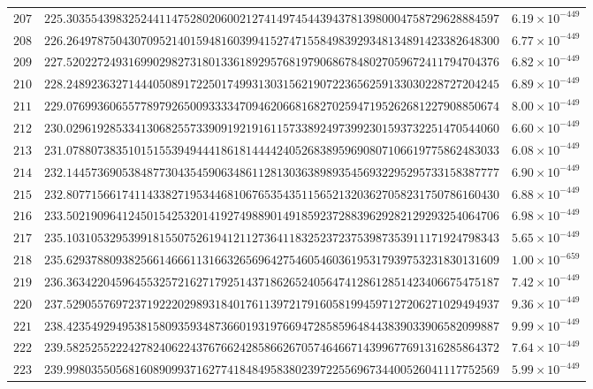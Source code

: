 \documentclass[12pt,reqno]{amsart}
\theoremstyle{remark}
\begin{document}
\begin{longtable}{clc}
$207$ & $225.3035543983252441147528020600212741497454439437813980004758729628884597$ & $6.19\times 10^{-449}$ \\
$208$ & $226.2649787504307095214015948160399415274715584983929348134891423382648300$ & $6.77\times 10^{-449}$ \\
$209$ & $227.5202272493169902982731801336189295768197906867848027059672411794704376$ & $6.82\times 10^{-449}$ \\
$210$ & $228.2489236327144405089172250174993130315621907223656259133030228727204245$ & $6.89\times 10^{-449}$ \\
$211$ & $229.0769936065577897926500933334709462066816827025947195262681227908850674$ & $8.00\times 10^{-449}$ \\
$212$ & $230.0296192853341306825573390919219161157338924973992301593732251470544060$ & $6.60\times 10^{-449}$ \\
$213$ & $231.0788073835101515539494441861814444240526838959690807106619775862483033$ & $6.08\times 10^{-449}$ \\
$214$ & $232.1445736905384877304354590634861128130363898935456932295295733158387777$ & $6.90\times 10^{-449}$ \\
$215$ & $232.8077156617411433827195344681067653543511565213203627058231750786160430$ & $6.88\times 10^{-449}$ \\
$216$ & $233.5021909641245015425320141927498890149185923728839629282129293254064706$ & $6.98\times 10^{-449}$ \\
$217$ & $235.1031053295399181550752619412112736411832523723753987353911171924798343$ & $5.65\times 10^{-449}$ \\
$218$ & $235.6293788093825661466611316632656964275460546036195317939753231830131609$ & $1.00\times 10^{-659}$ \\
$219$ & $236.3634220459645532572162717925143718626524056474128612851423406675475187$ & $7.42\times 10^{-449}$ \\
$220$ & $237.5290557697237192220298931840176113972179160581994597127206271029494937$ & $9.36\times 10^{-449}$ \\
$221$ & $238.4235492949538158093593487366019319766947285859648443839033906582099887$ & $9.99\times 10^{-449}$ \\
$222$ & $239.5825255222427824062243767662428586626705746466714399677691316285864372$ & $7.64\times 10^{-449}$ \\
$223$ & $239.9980355056816089099371627741848495838023972255696734400526041117752569$ & $5.99\times 10^{-449}$ \\

\end{longtable}
\end{document}
